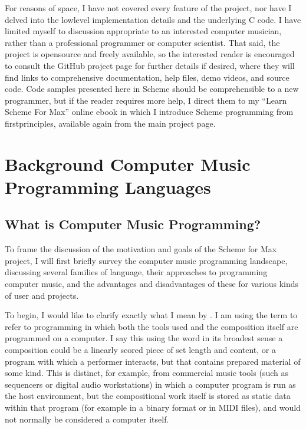 \documentclass[letterpaper,10pt,english]{sphinxmanual}
\begin{document}
\sphinxAtStartPar
For reasons of space, I have not covered every feature of the project, nor have I delved into the
low\sphinxhyphen{}level implementation details and the underlying C code. I have limited myself to discussion appropriate
to an interested computer musician, rather than a professional programmer or computer scientist.
That said, the project is open\sphinxhyphen{}source and freely available, so the
interested reader is encouraged to consult the GitHub project page for further details if desired,
where they will find links to comprehensive documentation, help files, demo videos, and source code.
Code samples presented here in Scheme should be comprehensible to a new programmer,
but if the reader requires more help, I direct them to my “Learn Scheme For Max” online
e\sphinxhyphen{}book in which I introduce Scheme programming from first\sphinxhyphen{}principles, available again
from the main project page.

\sphinxAtStartPar
{}

\sphinxstepscope


\chapter{Background \sphinxhyphen{} Computer Music Programming Languages}
\label{\detokenize{background:background-computer-music-programming-languages}}\label{\detokenize{background::doc}}

\section{What is Computer Music Programming?}
\label{\detokenize{background:what-is-computer-music-programming}}
\sphinxAtStartPar
To frame the discussion of the motivation and goals of the Scheme for Max project, I will
first briefly survey the computer music programming landscape, discussing several families of
language, their approaches to programming computer music, and the advantages and disadvantages of these
for various kinds of user and projects.

\sphinxAtStartPar
To begin, I would like to clarify exactly what I mean by .
I am using the term to refer to programming in which both the tools used and the composition itself
are programmed on a computer.
I say this using the word  in its broadest sense \sphinxhyphen{} a composition could
be a linearly scored piece of set length and content, or a program with which
a performer interacts, but that contains prepared material of some kind.
This is distinct, for example, from commercial music tools (such as sequencers or digital
audio workstations) in which a computer program is run as the host environment, but the compositional
work itself is stored as static data within that program (for example in a binary format or
in MIDI files), and would not normally be considered a computer  itself.
\end{document}
